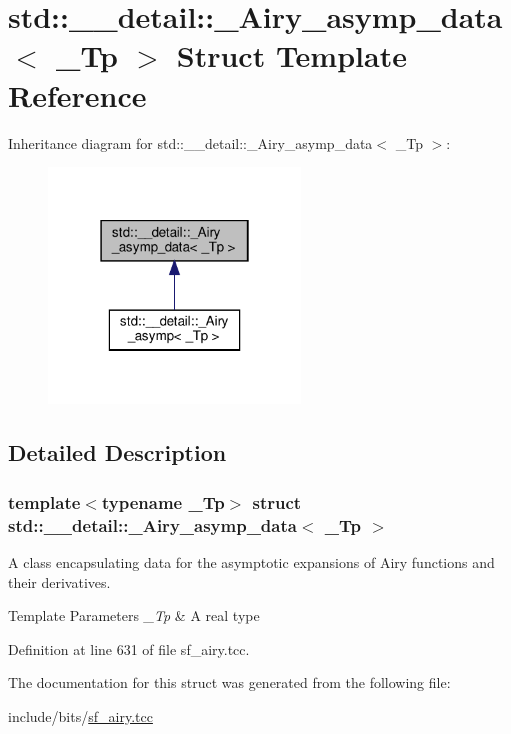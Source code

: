 \hypertarget{structstd_1_1____detail_1_1__Airy__asymp__data}{}\section{std\+:\+:\+\_\+\+\_\+detail\+:\+:\+\_\+\+Airy\+\_\+asymp\+\_\+data$<$ \+\_\+\+Tp $>$ Struct Template Reference}
\label{structstd_1_1____detail_1_1__Airy__asymp__data}


Inheritance diagram for std\+:\+:\+\_\+\+\_\+detail\+:\+:\+\_\+\+Airy\+\_\+asymp\+\_\+data$<$ \+\_\+\+Tp $>$\+:
\nopagebreak
\begin{figure}[H]
\begin{center}
\leavevmode
\includegraphics[width=190pt]{structstd_1_1____detail_1_1__Airy__asymp__data__inherit__graph}
\end{center}
\end{figure}


\subsection{Detailed Description}
\subsubsection*{template$<$typename \+\_\+\+Tp$>$\newline
struct std\+::\+\_\+\+\_\+detail\+::\+\_\+\+Airy\+\_\+asymp\+\_\+data$<$ \+\_\+\+Tp $>$}

A class encapsulating data for the asymptotic expansions of Airy functions and their derivatives.


\begin{DoxyTemplParams}{Template Parameters}
{\em \+\_\+\+Tp} & A real type \\
\hline
\end{DoxyTemplParams}


Definition at line 631 of file sf\+\_\+airy.\+tcc.



The documentation for this struct was generated from the following file\+:\begin{DoxyCompactItemize}
\item 
include/bits/\hyperlink{sf__airy_8tcc}{sf\+\_\+airy.\+tcc}\end{DoxyCompactItemize}
